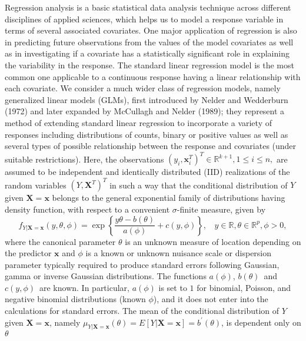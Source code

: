 \documentclass[a4paper]{article}%
\begin{document}
Regression analysis is a basic statistical data analysis technique across different disciplines of applied sciences,
which helps us to model a response variable in terms of several associated covariates.
One major application of regression is also in predicting future observations from the values of the model covariates 
as well as in investigating if a covariate has a statistically significant role in explaining the variability in the response.  
The standard linear regression model is the most common one applicable to a continuous response
having a linear relationship with each covariate. 
We consider a much wider class of regression models, namely 
generalized linear models (GLMs),  first introduced by Nelder and Wedderburn
(1972) and later expanded by McCullagh and Nelder (1989);
they  represent a method of extending standard linear regression to incorporate a variety of responses
including distributions of counts, binary or positive values as well as several types of possible relationship
between the response and covariates (under suitable restrictions). 
Here, the observations
$\left(  y_{i},\boldsymbol{x}_{i}^{T}\right)  ^{T}\in\mathbb{R}^{k+1},\text{
}1\leq i\leq n,$
are assumed to be independent and identically distributed (IID) realizations 
of the random variables $(Y,\boldsymbol{X}^{T})^{T}$
in such a way that the conditional distribution of $Y$ given $\boldsymbol{X=x}$ belongs
to the general exponential family of distributions having density function,
with respect to a convenient $\sigma$-finite measure, given by
\begin{equation}
f_{Y|\boldsymbol{X=x}}\left(  y,\theta,\phi\right)  =\exp\left\{
\frac{y\theta-b(\theta)}{a(\phi)}+c\left(  y,\phi\right)  \right\}  ,\ \ \ \ y \in \mathbb{R}, \theta \in \mathbb{R}^p, \phi >0,
\label{1}%
\end{equation}
where the canonical parameter $\theta$ is an unknown measure of location
depending on the predictor $\boldsymbol{x}$ and $\phi$ is a known or unknown
nuisance scale or dispersion parameter typically required to produce standard
errors following Gaussian, gamma or inverse Gaussian distributions. The
functions $a(\phi)$, $b(\theta)$\ and $c\left(  y,\phi\right)  $\ are known.
In particular, $a(\phi)$ is set to $1$ for binomial, Poisson, and negative
binomial distributions (known $\phi$), and it does not enter into the
calculations for standard errors. The mean of the conditional distribution of
$Y$ given $\boldsymbol{X=x}$, 
namely  $\mu_{Y|\boldsymbol{X=x}}(\theta)=E\left[Y|\boldsymbol{X=x}\right] =b^{\prime}(\theta)$, 
is dependent only on $\theta$ 
\end{document}
